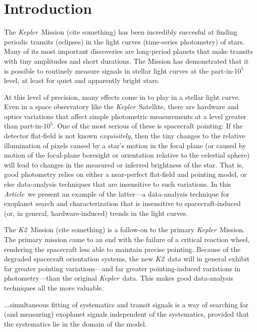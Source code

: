 \documentclass[12pt,preprint]{aastex}
\newcommand{\project}[1]{\textsl{#1}} %
\newcommand{\kepler}{\project{Kepler}}
\newcommand{\KT}{\project{K2}}
\newcommand{\paper}{\textsl{Article}}
\begin{document}

\section{Introduction}

The \kepler\ Mission (cite something) has been incredibly succesful at
finding periodic transits (eclipses) in the light curves (time-series
photometry) of stars.
Many of its most important discoveries are long-period planets that
make transits with tiny amplitudes and short durations.
The Mission has demonstrated that it is possible to routinely measure
signals in stellar light curves at the part-in-$10^5$ level, at least
for quiet and apparently bright stars.

At this level of precision, many effects come in to play in a stellar
light curve.
Even in a space observatory like the \kepler\ Satellite, there are
hardware and optics variations that affect simple photometric
measurements at a level greater than part-in-$10^5$.
One of the most serious of these is spacecraft pointing:
If the detector flat-field is not known \emph{exquisitely}, then the
tiny changes to the relative illumination of pixels caused by a star's
motion in the focal plane (or caused by motion of the focal-plane
boresight or orientation relative to the celestial sphere) will lead
to changes in the measured or inferred brightness of the star.
That is, good photometry relies on either a near-perfect flat-field
and pointing model, or else data-analysis techniques that are
insensitive to such variations.
In this \paper\ we present an example of the latter---a
data-analysis technique for exoplanet search and characterization that
is insensitive to spacecraft-induced (or, in general,
hardware-induced) trends in the light curves.

The \KT\ Mission (cite something) is a follow-on to the primary
\kepler\ Mission.
The primary mission came to an end with the failure of a critical
reaction wheel, rendering the spacecraft less able to maintain precise
pointing.
Because of the degraded spacecraft orientation systems, the new
\KT\ data will in general exhibit far greater pointing
variations---and far greater pointing-induced variations in
photometry---than the original \kepler\ data.
This makes good data-analysis techniques all the more valuable.

...simultaneous fitting of systematics and transit signals is a way of
searching for (and measuring) exoplanet signals independent of the
systematics, provided that the systematics lie in the domain of the
model.
\end{document}
